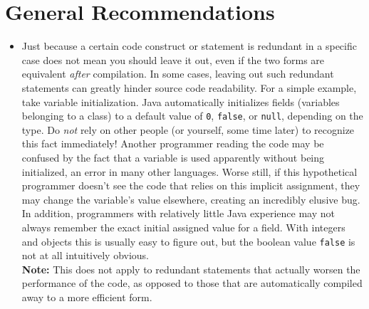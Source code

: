 \documentclass[12pt]{article}
\newcommand{\code}[1]{\texttt{#1}}
\begin{document}
\section{General Recommendations}
\begin{itemize}
    \item Just because a certain code construct or statement is redundant in a specific case does not mean you should leave it out, even if the two forms are equivalent \emph{after} compilation. In some cases, leaving out such redundant statements can greatly hinder source code readability. For a simple example, take variable initialization. Java automatically initializes fields (variables belonging to a class) to a default value of \code{0}, \code{false}, or \code{null}, depending on the type. Do \emph{not} rely on other people (or yourself, some time later) to recognize this fact immediately! Another programmer reading the code may be confused by the fact that a variable is used apparently without being initialized, an error in many other languages. Worse still, if this hypothetical programmer doesn't see the code that relies on this implicit assignment, they may change the variable's value elsewhere, creating an incredibly elusive bug. In addition, programmers with relatively little Java experience may not always remember the exact initial assigned value for a field. With integers and objects this is usually easy to figure out, but the boolean value \code{false} is not at all intuitively obvious.\\
        \textbf{Note:} This does not apply to redundant statements that actually worsen the performance of the code, as opposed to those that are automatically compiled away to a more efficient form. 

\end{itemize}
\end{document}
